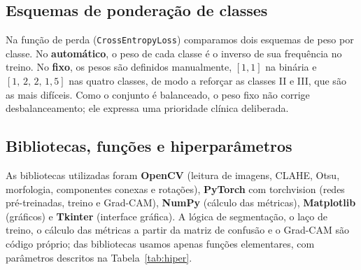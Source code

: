 \documentclass[twocolumn,a4paper,11pt]{article}
\begin{document}
\subsection{Esquemas de ponderação de classes}

Na função de perda (\texttt{CrossEntropyLoss}) comparamos dois esquemas de peso por
classe. No \textbf{automático}, o peso de cada classe é o inverso de sua frequência
no treino. No \textbf{fixo}, os pesos são definidos manualmente, $[1,1]$ na binária
e $[1,\,2,\,2,\,1{,}5]$ nas quatro classes, de modo a reforçar as classes II e III,
que são as mais difíceis. Como o conjunto é balanceado, o peso fixo não corrige
desbalanceamento; ele expressa uma prioridade clínica deliberada.

\subsection{Bibliotecas, funções e hiperparâmetros}

As bibliotecas utilizadas foram \textbf{OpenCV} (leitura de imagens, CLAHE, Otsu,
morfologia, componentes conexas e rotações), \textbf{PyTorch} com torchvision
(redes pré\nobreakdash-treinadas, treino e Grad\nobreakdash-CAM), \textbf{NumPy} (cálculo das
métricas), \textbf{Matplotlib} (gráficos) e \textbf{Tkinter} (interface gráfica). A
lógica de segmentação, o laço de treino, o cálculo das métricas a partir da matriz
de confusão e o Grad\nobreakdash-CAM são código próprio; das bibliotecas usamos apenas funções
elementares, com parâmetros descritos na Tabela~\ref{tab:hiper}.
\end{document}
